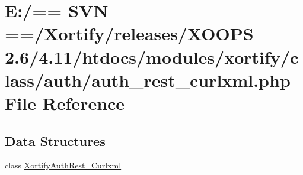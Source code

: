 \hypertarget{auth__rest__curlxml_8php}{\section{E\-:/== S\-V\-N ==/\-Xortify/releases/\-X\-O\-O\-P\-S 2.6/4.11/htdocs/modules/xortify/class/auth/auth\-\_\-rest\-\_\-curlxml.php File Reference}
\label{auth__rest__curlxml_8php}
}
\subsection*{Data Structures}
\begin{DoxyCompactItemize}
\item 
class \hyperlink{class_xortify_auth_rest___curlxml}{Xortify\-Auth\-Rest\-\_\-\-Curlxml}
\end{DoxyCompactItemize}
